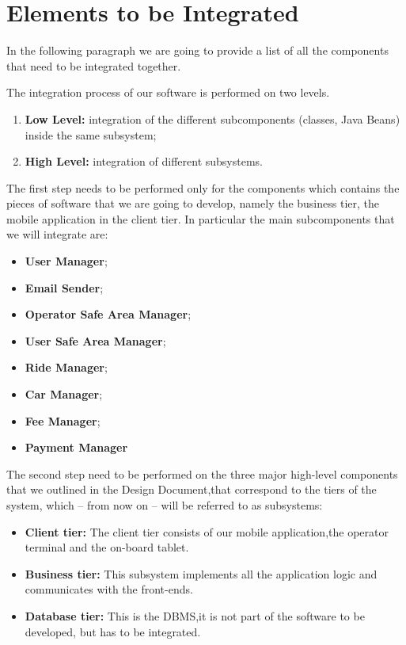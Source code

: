\section{Elements to be Integrated}
In the following paragraph we are going to provide a list of all the components that need to be integrated together.

The integration process of our software is performed on two levels.
\begin{enumerate}
\item \textbf{Low Level:} integration of the different subcomponents (classes, Java Beans) inside the
same subsystem;
\item \textbf{High Level:} integration of different subsystems.
\end{enumerate}

The first step needs to be performed only for the components which contains
the pieces of software that we are going to develop, namely the business
tier, the mobile application in the client tier.
In particular the main subcomponents  that we will integrate are:
\begin{itemize}
\item \textbf{User Manager};
\item \textbf{Email Sender};
\item \textbf{Operator Safe Area Manager};
\item \textbf{User Safe Area Manager};
\item \textbf{Ride Manager};
\item \textbf{Car Manager};
\item \textbf{Fee Manager};
\item \textbf{Payment Manager}
\end{itemize}


The second step need to be performed on the three major high-level components that we outlined in the Design Document,that correspond to the tiers of the system, which – from now on – will
be referred to as subsystems:
\begin{itemize}
\item \textbf{Client tier:} The client tier consists of our mobile application,the operator terminal and the on-board tablet.
\item\textbf{Business tier:} This subsystem implements all the application logic and
communicates with the front-ends.
\item \textbf{Database tier:} This is the DBMS,it is not part of the software to be developed,
but has to be integrated.
\end{itemize}



